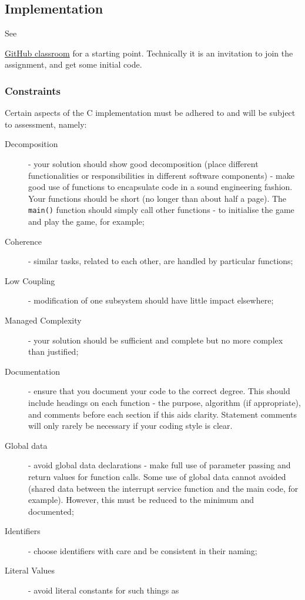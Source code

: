 \documentclass[a4paper]{article}
\begin{document}
\subsection{Implementation}\label{implementation}
See
{\href{https://classroom.github.com/assignment-invitations/e0d3930cc5cf943bd1c10642b750ac8e}{GitHub
  classroom}
 for a starting point.  Technically it is an invitation to join the
 assignment, and get some initial code.

\subsubsection{Constraints}
Certain aspects of the C implementation must be adhered to and will be
subject to assessment, namely:
\begin{description}
\item [Decomposition] - your solution should show good decomposition
  (place different functionalities or responsibilities in different
  software components) - make good use of functions to encapsulate
  code in a sound engineering fashion.  Your functions should be short
  (no longer than about half a page).  The {\tt main()} function
  should simply call other functions - to initialise the game and play
  the game, for example;
\item [Coherence] - similar tasks, related to each other, are handled
  by particular functions;
\item [Low Coupling] - modification of one subsystem should have
  little impact elsewhere;
\item [Managed Complexity] - your solution should be sufficient and
  complete but no more complex than justified;
\item [Documentation] - ensure that you document your code to the
  correct degree.  This should include headings on each function - the
  purpose, algorithm (if appropriate), and comments before each
  section if this aids clarity.  Statement comments will only rarely
  be necessary if your coding style is clear.
\item [Global data] - avoid global data declarations - make full use
  of parameter passing and return values for function calls.  Some use
  of global data cannot avoided (shared data between the interrupt
  service function and the main code, for example).  However, this
  must be reduced to the minimum and documented;
\item [Identifiers] - choose identifiers with care and be consistent
  in their naming;
\item [Literal Values] - avoid literal constants for such things as

\end{description}}
\end{document}

